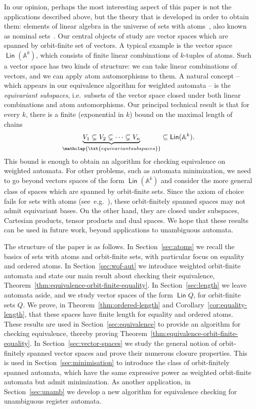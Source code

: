 \documentclass[10pt,a4paper]{amsart}
\numberwithin{equation}{section}
\newcommand{\myunderbrace}[2]{\underbrace{#1}_{\mathclap{\txt{\scriptsize #2}}}}
\newcommand{\atoms}{\mathbb A}
\DeclareMathOperator{\lin}{\mathsf{Lin}}
\begin{document}
In our opinion, perhaps the most interesting aspect of this paper is not the applications described above, but the theory that is developed in order to obtain them: elements of linear algebra in the universe of sets with atoms~\cite{bojanczyk_slightly2018}, also known as nominal sets~\cite{pitts}.
Our central objects of study are vector spaces which are spanned by orbit-finite set of vectors. A typical example is the vector space $\lin (\atoms^k)$,  which consists of finite linear combinations of $k$-tuples of atoms. Such a vector space has two kinds of structure: we can take linear combinations of vectors, and we can apply atom automorphisms to them.  A natural concept -- which appears  in our equivalence algorithm for weighted automata -- is the  \emph{equivariant subspaces}, i.e.~subsets of the vector space  closed under both linear combinations and atom automorphisms. Our principal technical result is that for every $k$, there is a finite (exponential in $k$) bound on the maximal length of chains
\begin{align*}
\myunderbrace{V_1 \subsetneq V_2 \subsetneq \cdots \subsetneq V_n}{equivariant subspaces} \subseteq \lin (\atoms^k).
\end{align*}
This bound is enough to obtain an algorithm for checking equivalence on weighted automata. For other problems, such as automata minimization, we need to go beyond vectors spaces of the form $\lin (\atoms^k)$ and consider the more general class of spaces which are spanned by orbit-finite sets. Since the axiom of choice fails for sets with atoms (see~e.g.~\cite[Sec.~2.7]{pitts}), these orbit-finitely spanned spaces may not admit equivariant bases. On the other hand, they are closed under subspaces, Cartesian products, tensor products and dual spaces. We hope that these results can be used in future work, beyond applications to unambiguous automata. 

The structure of the paper is as follows. In Section~\ref{sec:atoms} we recall the basics of sets with atoms and orbit-finite sets, with particular focus on equality and ordered atoms. In Section~\ref{sec:wof-aut} we introduce weighted orbit-finite automata and state our main result about checking their equivalence, Theorem~\ref{thm:equivalence-orbit-finite-equality}. In Section~\ref{sec:length} we leave automata aside, and we study vector spaces of the form $\lin Q$, for orbit-finite sets $Q$. We prove, in Theorem~\ref{thm:ordered-length} and Corollary~\ref{cor:equality-length}, that these spaces have finite length for equality and ordered atoms. These results are used in Section~\ref{sec:equivalence} to provide an algorithm for checking equivalence, thereby proving Theorem~\ref{thm:equivalence-orbit-finite-equality}. In Section~\ref{sec:vector-spaces} we study the general notion of orbit-finitely spanned vector spaces and prove their numerous closure properties. This is used in Section~\ref{sec:minimisation} to introduce the class of orbit-finitely spanned automata, which have the same expressive power as weighted orbit-finite automata but admit minimization. As another application, in Section~\ref{sec:unamb} we develop a new algorithm for equivalence checking for unambiguous register automata.
\end{document}
